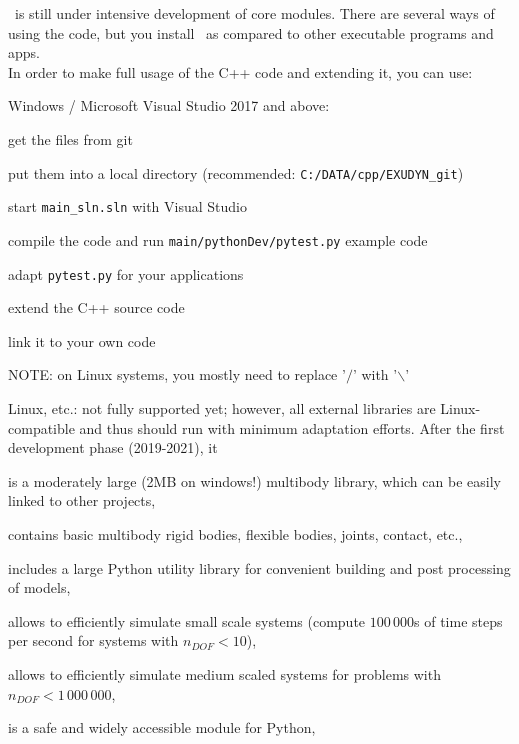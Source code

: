 \codeName\ is still under intensive development of core modules.
There are several ways of using the code, but you  install \codeName\ as compared to other executable programs and apps.
\vspace{6pt}\\
In order to make full usage of the C++ code and extending it, you can use:
\bi
  \item Windows / Microsoft Visual Studio 2017 and above:
  \bi
    \item get the files from git
    \item put them into a local directory (recommended: \texttt{C:/DATA/cpp/EXUDYN\_git})
    \item start \texttt{main\_sln.sln} with Visual Studio
    \item compile the code and run \texttt{main/pythonDev/pytest.py} example code
    \item adapt \texttt{pytest.py} for your applications
    \item extend the C++ source code
    \item link it to your own code
    \item NOTE: on Linux systems, you mostly need to replace '$/$' with '$\backslash$'
  \ei
  \item Linux, etc.: not fully supported yet; however, all external libraries are Linux-compatible and thus should run with minimum adaptation efforts.
\ei
%
After the first development phase (2019-2021), it
\bi
  \item is a moderately large (2MB on windows!) multibody library, which can be easily linked to other projects,
  \item contains basic multibody rigid bodies, flexible bodies, joints, contact, etc.,
  \item includes a large Python utility library for convenient building and post processing of models,
  \item allows to efficiently simulate small scale systems (compute $100\,000$s of time steps per second for systems with $n_{DOF}<10$),
  \item allows to efficiently simulate medium scaled systems for problems with $n_{DOF} < 1\,000\,000$,
  \item is a safe and widely accessible module for Python,
